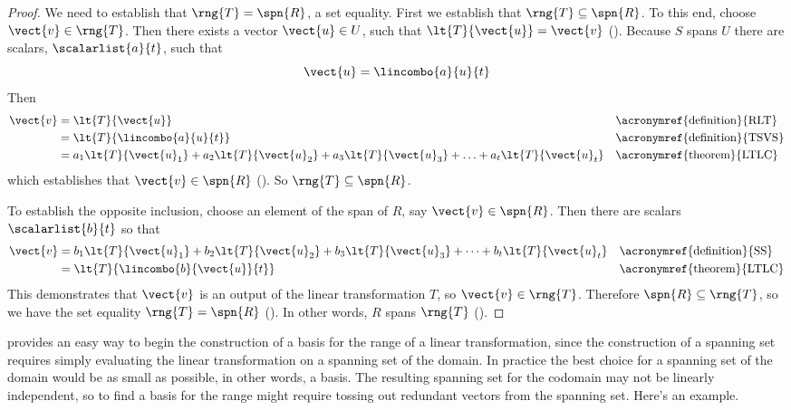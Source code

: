 \begin{proof}
We need to establish that $\rng{T}=\spn{R}$, a set equality.  First we establish that $\rng{T}\subseteq\spn{R}$.  To this end, choose $\vect{v}\in\rng{T}$.  Then there exists a vector $\vect{u}\in U$, such that $\lt{T}{\vect{u}}=\vect{v}$ ().  Because $S$ spans $U$ there are scalars, $\scalarlist{a}{t}$, such that
%
\begin{equation*}
\vect{u}=\lincombo{a}{u}{t}
\end{equation*}
%
Then
%
\begin{align*}
\vect{v}
&=\lt{T}{\vect{u}}&&\text{\acronymref{definition}{RLT}}\\
&=\lt{T}{\lincombo{a}{u}{t}}&&\text{\acronymref{definition}{TSVS}}\\
&=a_1\lt{T}{\vect{u}_1}+a_2\lt{T}{\vect{u}_2}+a_3\lt{T}{\vect{u}_3}+\ldots+a_t\lt{T}{\vect{u}_t}&&\text{\acronymref{theorem}{LTLC}}\\
\end{align*}
%
which establishes that $\vect{v}\in\spn{R}$ ().  So $\rng{T}\subseteq\spn{R}$.\par
%
To establish the opposite inclusion, choose an element of the span of $R$, say $\vect{v}\in\spn{R}$.  Then there are scalars $\scalarlist{b}{t}$ so that
%
\begin{align*}
\vect{v}
&=b_1\lt{T}{\vect{u}_1}+b_2\lt{T}{\vect{u}_2}+b_3\lt{T}{\vect{u}_3}+\cdots+b_t\lt{T}{\vect{u}_t}
&&\text{\acronymref{definition}{SS}}\\
&=\lt{T}{\lincombo{b}{\vect{u}}{t}}&&\text{\acronymref{theorem}{LTLC}}
\end{align*}
%
This demonstrates that $\vect{v}$ is an output of the linear transformation $T$, so $\vect{v}\in\rng{T}$.  Therefore $\spn{R}\subseteq\rng{T}$, so we have the set equality $\rng{T}=\spn{R}$ ().  In other words, $R$ spans $\rng{T}$ ().
%
\end{proof}
%
 provides an easy way to begin the construction of a basis for the range of a linear transformation, since the construction of a spanning set requires simply evaluating the linear transformation on a spanning set of the domain.  In practice the best choice for a spanning set of the domain would be as small as possible, in other words, a basis.  The resulting spanning set for the codomain may not be linearly independent, so to find a basis for the range might require tossing out redundant vectors from the spanning set.  Here's an example.
